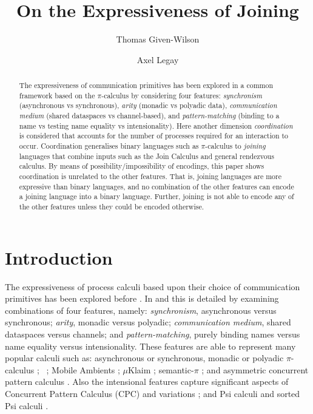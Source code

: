 \documentclass[submission,copyright,creativecommons]{eptcs}
\title{On the Expressiveness of Joining}
\author{Thomas Given-Wilson
\institute{Inria, France}
\and
Axel Legay
\institute{Inria, France}
}
\begin{document}
\makeatactive

\maketitle  

\begin{abstract}
The expressiveness of communication primitives has been explored in a common framework
based on the $\pi$-calculus by considering
four features:
{\em synchronism} (asynchronous vs synchronous),
{\em arity} (monadic vs polyadic data),
{\em communication medium} (shared dataspaces vs channel-based),
and {\em pattern-matching} (binding to a name vs testing name equality  vs intensionality).
Here another dimension {\em coordination} is considered that accounts for the number of
processes required for an interaction to occur.
Coordination generalises binary languages such as $\pi$-calculus to {\em joining} languages
that combine inputs such as the Join Calculus and general rendezvous calculus.
By means of possibility/impossibility of encodings, this paper shows coordination is unrelated to the other features.
That is, joining languages are more expressive than binary languages, and no combination
of the other features can encode a joining language into a binary language.
Further, joining is not able to encode any of the other features unless they could be encoded
otherwise.
\end{abstract}

\section{Introduction}

The expressiveness of process calculi based upon their choice of communication primitives
has been explored before
\cite{Palamidessi:2003:CEP:966707.966709,journals/iandc/BusiGZ00,DeNicola:2006:EPK:1148743.1148750,G:IC08,GivenWilsonPHD,givenwilson:hal-01026301}.
In \cite{G:IC08} and \cite{givenwilson:hal-01026301} this is detailed by examining combinations
of four features, namely:
{\em synchronism}, asynchronous versus synchronous;
{\em arity}, monadic versus polyadic;
{\em communication medium}, shared dataspaces versus channels;
and {\em pattern-matching}, purely binding names versus name equality versus intensionality.
These features are able to represent many popular calculi \cite{G:IC08,givenwilson:hal-01026301} such as:
asynchronous or synchronous,  monadic or polyadic $\pi$-calculus
  \cite{Milner:1992:CMP:162037.162038,Milner:1992:CMP:162037.162039,milner:polyadic-tutorial};
\Linda~\cite{Gel85};
Mobile Ambients  \cite{DBLP:conf/fossacs/CardelliG98};
$\mu${\sc Klaim} \cite{10.1109/32.685256};
semantic-$\pi$ \cite{Castagna:2008:SSP:1367144.1367262};
and asymmetric concurrent pattern calculus \cite{DBLP:journals/corr/Given-Wilson14}.
Also the intensional features capture significant aspects of
Concurrent Pattern Calculus (CPC) \cite{GivenWilsonGorlaJay10,givenwilson:hal-00987578}
and variations \cite{GivenWilsonPHD,DBLP:journals/corr/Given-Wilson14};
and Psi calculi \cite{BJPV11} and sorted Psi calculi \cite{DBLP:conf/tgc/BorgstromGPVP13}.
\end{document}
